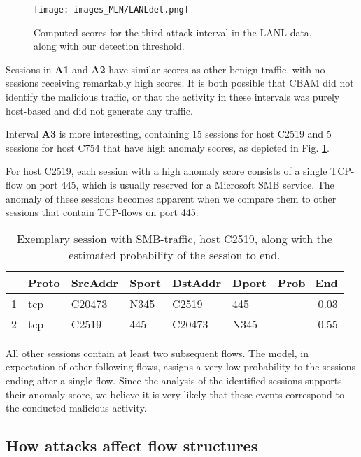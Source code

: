 \begin{figure}[ht]
\centering
\texttt{[image: images\_MLN/LANLdet.png]} \caption{Computed scores for the third attack interval in the LANL data, along with our detection threshold.}\label{fig:LANLdetection}
\end{figure}

Sessions in \textbf{A1} and \textbf{A2} have similar scores as other benign traffic, with no sessions receiving remarkably high scores. It is both possible that CBAM did not identify the malicious traffic, or that the activity in these intervals was purely host-based and did not generate any traffic. 

Interval \textbf{A3} is more interesting, containing 15 sessions for host C2519 and 5 sessions for host C754 that have high anomaly scores, as depicted in Fig. \ref{fig:LANLdetection}.






For host C2519, each session with a high anomaly score consists of a single TCP-flow on port 445, which is usually reserved for a Microsoft SMB service. The anomaly of these sessions becomes apparent when we compare them to other sessions that contain TCP-flows on port 445. 

\begin{table}[ht]
\centering
\begin{tabular}{rlllllr}
  \hline
 & Proto & SrcAddr & Sport & DstAddr & Dport & Prob\_End \\ 
  \hline
1 & tcp & C20473 & N345 & C2519 & 445 & 0.03 \\ 
  2 & tcp & C2519 & 445 & C20473 & N345 & 0.55 \\ 
   \hline
\end{tabular}
\caption{Exemplary session with SMB-traffic,  host C2519, along with the estimated probability of the session to end.} 
\label{tab:MalSessionLANL}
\end{table}

All other sessions contain at least two subsequent flows. The model, in expectation of other following flows, assigns a very low probability to the sessions ending after a single flow. Since the analysis of the identified sessions supports their anomaly score, we believe it is very likely that these events correspond to the conducted malicious activity. 


\subsection{How attacks affect flow structures}\label{sec:AttackInfl}

